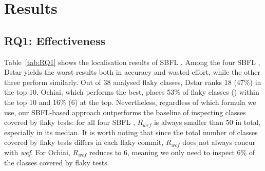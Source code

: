 \section{Results}
\label{sec:sherloc-results}


\subsection{RQ1: Effectiveness}

Table~\ref{tab:RQ1} shows the localisation results of SBFL \formulas.
Among the four SBFL \formulas, Dstar yields the worst results both in accuracy and wasted effort, while the other three perform similarly. Out of 38 analysed flaky classes, Dstar ranks 18 (47\%) in the top 10. Ochiai, which performs the best, places 53\% of flaky classes () within the top 10 and 16\% (6) at the top. Nevertheless, regardless of which formula we use, our SBFL-based approach outperforms the baseline of inspecting classes covered by flaky tests: for all four SBFL \formulas, $R_{wef}$ is always smaller than 50 in total, especially in its median. It is worth noting that since the total number of classes covered by flaky tests differs in each flaky commit, $R_{wef}$ does not always concur with \textit{wef}. For Ochiai, $R_{wef}$ reduces to 6, meaning we only need to inspect 6\% of the classes covered by flaky tests.  

